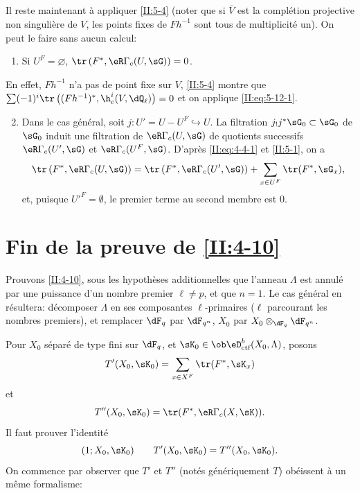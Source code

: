 \subsection{}\label{II:5-13}

Il reste maintenant à appliquer \ref{II:5-4} (noter que si $\bar V$ est la 
complétion projective non singulière de $V$, les points fixes de $F h^{-1}$ 
sont tous de multiplicité un). On peut le faire sans aucun calcul: 
\begin{enumerate}[\indent A.]
  \item Si $U^F=\varnothing$, $\tr\left(F^*,\eR\Gamma_c(U,\sG)\right) = 0$. \end{enumerate}

En effet, $F h^{-1}$ n'a pas de point fixe sur $V$, \ref{II:5-4} montre que 
$\sum (-1)^i \tr\left((F h^{-1})^*,\h_c^i(V,\dQ_\ell)\right)=0$ et on 
applique \eqref{II:eq:5-12-1}.
\begin{enumerate}[\indent A.]
\setcounter{enumi}{1}
  \item {}Dans le cas général, soit $j:U'=U-U^F\hookrightarrow U$. 
    La filtration  $j_! j^* \sG_0\subset \sG_0$ de $\sG_0$ induit une 
    filtration de $\eR\Gamma_c(U,\sG)$ de quotients successifs 
    $\eR\Gamma_c(U',\sG)$ et $\eR\Gamma_c(U^F,\sG)$. D'après \eqref{II:eq:4-4-1} 
    et \ref{II:5-1}, on a 
    \[
      \tr\left(F^*,\eR\Gamma_c(U,\sG)\right) = \tr\left(F^*,\eR\Gamma_c(U',\sG)\right) + \sum_{x\in U^F} \tr(F^*,\sG_x) \text{,}
    \]
    et, puisque ${U'}^F=\emptyset$, le premier terme au second membre est $0$. 
\end{enumerate}










\section{Fin de la preuve de \ref{II:4-10}}\label{II:6}

Prouvons \ref{II:4-10}, sous les hypothèses additionnelles que l'anneau 
$\Lambda$ est annulé par une puissance d'un nombre premier $\ell\ne p$, et 
que $n=1$. Le cas général en résultera: décomposer $\Lambda$ en ses 
composantes $\ell$-primaires ($\ell$ parcourant les nombres premiers), et 
remplacer $\dF_q$ par $\dF_{q^n}$, $X_0$ par $X_0\otimes_{\dF_q}\dF_{q^n}$. 

Pour $X_0$ séparé de type fini sur $\dF_q$, et 
$\sK_0\in\ob\eD_\text{ctf}^b(X_0,\Lambda)$, posons 
\[
  T'(X_0,\sK_0) = \sum_{x\in X^F} \tr(F^*,\sK_x)
\]
et
\[
  T''(X_0,\sK_0) = \tr(F^*,\eR\Gamma_c(X,\sK)) \text{.}
\]
Il faut prouver l'identité 
\[
  (1;X_0,\sK_0) \qquad T'(X_0,\sK_0) = T''(X_0,\sK_0) \text{.}
\]
On commence par observer que $T'$ et $T''$ (notés génériquement $T$) 
obéissent à un même formalisme:

